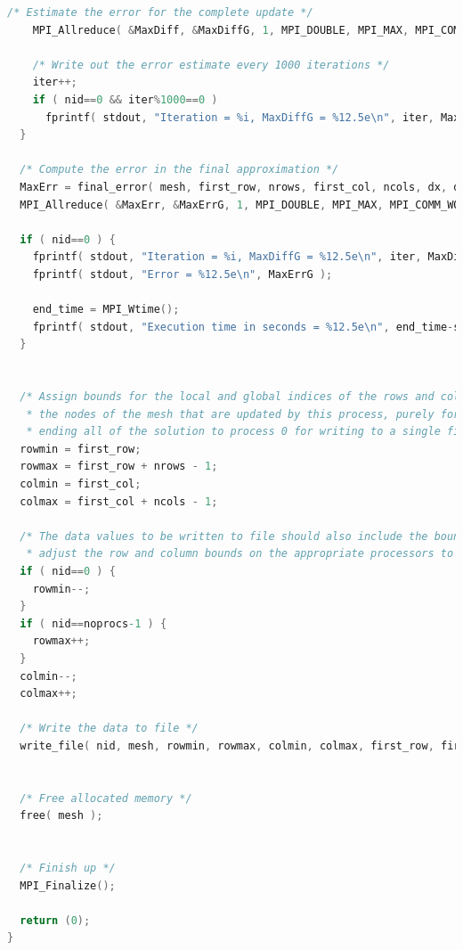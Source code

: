 \documentclass{article}
\begin{document}
\begin{lstlisting}[language=C,frame=single]
    /* Estimate the error for the complete update */
    MPI_Allreduce( &MaxDiff, &MaxDiffG, 1, MPI_DOUBLE, MPI_MAX, MPI_COMM_WORLD );

    /* Write out the error estimate every 1000 iterations */
    iter++;
    if ( nid==0 && iter%1000==0 )
      fprintf( stdout, "Iteration = %i, MaxDiffG = %12.5e\n", iter, MaxDiffG );
  }

  /* Compute the error in the final approximation */
  MaxErr = final_error( mesh, first_row, nrows, first_col, ncols, dx, dy );
  MPI_Allreduce( &MaxErr, &MaxErrG, 1, MPI_DOUBLE, MPI_MAX, MPI_COMM_WORLD );

  if ( nid==0 ) {
    fprintf( stdout, "Iteration = %i, MaxDiffG = %12.5e\n", iter, MaxDiffG );
    fprintf( stdout, "Error = %12.5e\n", MaxErrG );

    end_time = MPI_Wtime();
    fprintf( stdout, "Execution time in seconds = %12.5e\n", end_time-start_time );
  }


  /* Assign bounds for the local and global indices of the rows and columns to indicate
   * the nodes of the mesh that are updated by this process, purely for the purpose of
   * ending all of the solution to process 0 for writing to a single file               */
  rowmin = first_row;
  rowmax = first_row + nrows - 1;
  colmin = first_col;
  colmax = first_col + ncols - 1;

  /* The data values to be written to file should also include the boundary values, so
   * adjust the row and column bounds on the appropriate processors to include these   */
  if ( nid==0 ) {
    rowmin--;
  }
  if ( nid==noprocs-1 ) {
    rowmax++;
  }
  colmin--;
  colmax++;

  /* Write the data to file */
  write_file( nid, mesh, rowmin, rowmax, colmin, colmax, first_row, first_col, noprocs );


  /* Free allocated memory */
  free( mesh );


  /* Finish up */
  MPI_Finalize();

  return (0);
}
\end{lstlisting}
\end{document}
